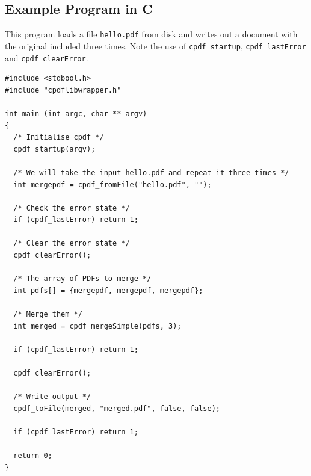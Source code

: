 \documentclass{book}
\begin{document}
\begin{cpdflib}
\chapter*{Example Program in C}

This program loads a file \texttt{hello.pdf} from disk and writes out a document with the original included three times. Note the use of \texttt{cpdf\_startup}, \texttt{cpdf\_lastError} and \texttt{cpdf\_clearError}.

\begin{small}
\begin{verbatim}
#include <stdbool.h>
#include "cpdflibwrapper.h"

int main (int argc, char ** argv)
{
  /* Initialise cpdf */
  cpdf_startup(argv);

  /* We will take the input hello.pdf and repeat it three times */
  int mergepdf = cpdf_fromFile("hello.pdf", "");

  /* Check the error state */
  if (cpdf_lastError) return 1;

  /* Clear the error state */
  cpdf_clearError();

  /* The array of PDFs to merge */
  int pdfs[] = {mergepdf, mergepdf, mergepdf};

  /* Merge them */
  int merged = cpdf_mergeSimple(pdfs, 3);
  
  if (cpdf_lastError) return 1;

  cpdf_clearError();

  /* Write output */
  cpdf_toFile(merged, "merged.pdf", false, false);

  if (cpdf_lastError) return 1;

  return 0;
}
\end{verbatim}
\end{small}
\end{cpdflib}
\end{document}
